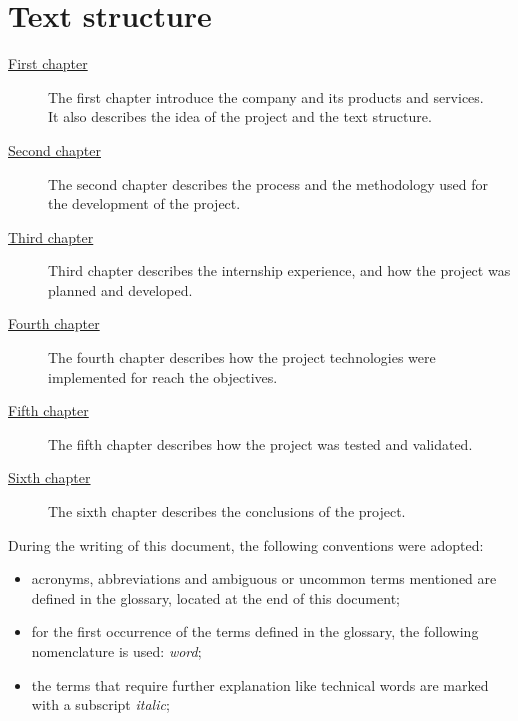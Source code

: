\section{Text structure}
\begin{description}
    \item[{\hyperref[cap:Introduction]{First chapter}}] 
    The first chapter introduce the company and its products and services.\\
    It also describes the idea of the project and the text structure.
    \item[{\hyperref[cap:process-methodologies]{Second chapter}}] The second chapter describes the process and the methodology used for the development of the project.
    \item[{\hyperref[cap:internship-desc]{Third chapter}}] Third chapter describes the internship experience, and how the project was planned and developed.
    \item[{\hyperref[cap:design-coding]{Fourth chapter}}] The fourth chapter describes how the project technologies were implemented for reach the objectives.
    \item[{\hyperref[cap:verification-validation]{Fifth chapter}}] The fifth chapter describes how the project was tested and validated.
    \item[{\hyperref[cap:conclusions]{Sixth chapter}}] The sixth chapter describes the conclusions of the project.
\end{description}

During the writing of this document, the following conventions were adopted:
\begin{itemize}
    \item acronyms, abbreviations and ambiguous or uncommon terms mentioned are defined in the glossary, located at the end of this document;
    \item for the first occurrence of the terms defined in the glossary, the following nomenclature is used: \emph{word}\glsfirstoccur;
	\item the terms that require further explanation like technical words are marked with a subscript \emph{italic};
\end{itemize}
